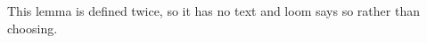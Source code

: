 \begin{lemma}\label{sy-999B}
This lemma is defined twice, so it has no text and loom says so rather than choosing.
\end{lemma}
